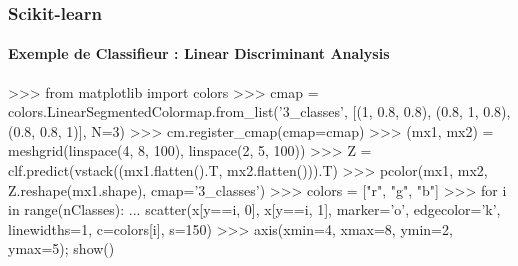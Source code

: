 \begin{frame}[fragile]
\frametitle{Scikit-learn}
\framesubtitle{Exemple de Classifieur : Linear Discriminant Analysis}
\begin{pythonConsole}
>>> from matplotlib import colors
>>> cmap = colors.LinearSegmentedColormap.from_list('3_classes', 
[(1, 0.8, 0.8), (0.8, 1, 0.8), (0.8, 0.8, 1)], N=3)
>>> cm.register_cmap(cmap=cmap)
>>> (mx1, mx2) = meshgrid(linspace(4, 8, 100), linspace(2, 5, 100))
>>> Z = clf.predict(vstack((mx1.flatten().T, mx2.flatten())).T)
>>> pcolor(mx1, mx2, Z.reshape(mx1.shape), cmap='3_classes')
>>> colors = ["r", "g", "b"]
>>> for i in range(nClasses): 
...   scatter(x[y==i, 0], x[y==i, 1], marker='o', edgecolor='k', linewidths=1, 
c=colors[i], s=150)
>>> axis(xmin=4, xmax=8, ymin=2, ymax=5); show()
\end{pythonConsole}
\end{frame}
